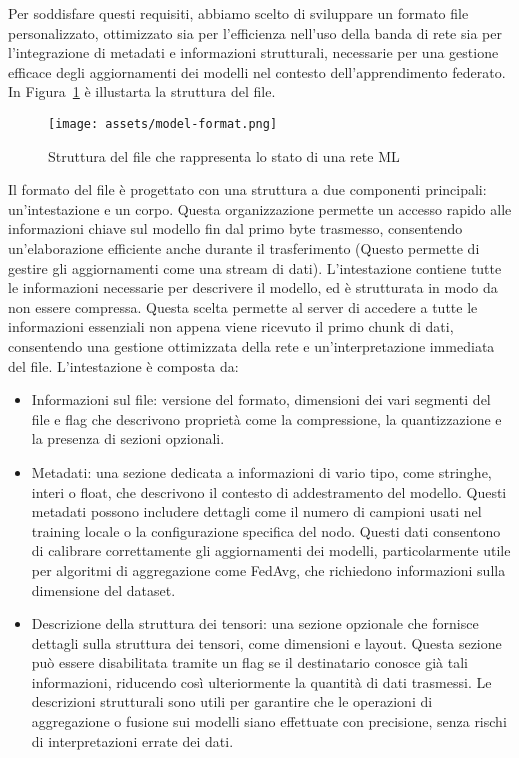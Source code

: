 \documentclass[a4paper, oneside, openright]{report}
\begin{document}
Per soddisfare questi requisiti, abbiamo scelto di sviluppare un formato file personalizzato, ottimizzato sia per l'efficienza nell'uso della banda di rete sia per l'integrazione di metadati e informazioni strutturali, necessarie per una gestione efficace degli aggiornamenti dei modelli nel contesto dell’apprendimento federato. In Figura~\ref{fig:model-format} è illustarta la struttura del file. 

\begin{figure}[h] 
\centering
\texttt{[image: assets/model-format.png]}
\caption{Struttura del file che rappresenta lo stato di una rete ML}\label{fig:model-format}
\end{figure}

Il formato del file è progettato con una struttura a due componenti principali: un'intestazione e un corpo. Questa organizzazione permette un accesso rapido alle informazioni chiave sul modello fin dal primo byte trasmesso, consentendo un'elaborazione efficiente anche durante il trasferimento (Questo permette di gestire gli aggiornamenti come una stream di dati). L’intestazione contiene tutte le informazioni necessarie per descrivere il modello, ed è strutturata in modo da non essere compressa. Questa scelta permette al server di accedere a tutte le informazioni essenziali non appena viene ricevuto il primo chunk di dati, consentendo una gestione ottimizzata della rete e un’interpretazione immediata del file. 
L'intestazione è composta da:
\begin{itemize}
    \item Informazioni sul file: versione del formato, dimensioni dei vari segmenti del file e flag che descrivono proprietà come la compressione, la quantizzazione e la presenza di sezioni opzionali.
    
    \item Metadati: una sezione dedicata a informazioni di vario tipo, come stringhe, interi o float, che descrivono il contesto di addestramento del modello. Questi metadati possono includere dettagli come il numero di campioni usati nel training locale o la configurazione specifica del nodo. Questi dati consentono di calibrare correttamente gli aggiornamenti dei modelli, particolarmente utile per algoritmi di aggregazione come FedAvg, che richiedono informazioni sulla dimensione del dataset.
    
    \item Descrizione della struttura dei tensori: una sezione opzionale che fornisce dettagli sulla struttura dei tensori, come dimensioni e layout. Questa sezione può essere disabilitata tramite un flag se il destinatario conosce già tali informazioni, riducendo così ulteriormente la quantità di dati trasmessi. Le descrizioni strutturali sono utili per garantire che le operazioni di aggregazione o fusione sui modelli siano effettuate con precisione, senza rischi di interpretazioni errate dei dati.
\end{itemize}
\end{document}
